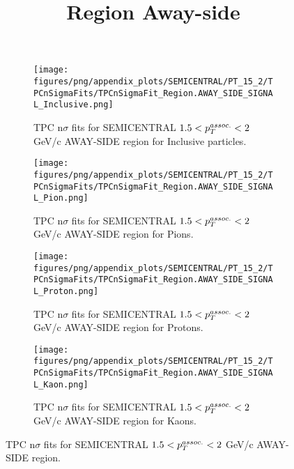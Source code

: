             \begin{figure}[H]
                \title{Region Away-side}
                \begin{subfigure}[b]{0.5\textwidth}
                    \centering
                    \texttt{[image: figures/png/appendix\_plots/SEMICENTRAL/PT\_15\_2/TPCnSigmaFits/TPCnSigmaFit\_Region.AWAY\_SIDE\_SIGNAL\_Inclusive.png]}
                    \caption{TPC n$\sigma$ fits for SEMICENTRAL $1.5 < \pTassoc < 2$ GeV/c AWAY-SIDE region for Inclusive particles.}
                    \label{fig:appendix_SEMICENTRAL_$1.5 < \pTassoc < 2$ GeV/c_AWAY_SIDE_SIGNAL_Inclusive}
                \end{subfigure}
                \begin{subfigure}[b]{0.5\textwidth}
                    \centering
                    \texttt{[image: figures/png/appendix\_plots/SEMICENTRAL/PT\_15\_2/TPCnSigmaFits/TPCnSigmaFit\_Region.AWAY\_SIDE\_SIGNAL\_Pion.png]}
                    \caption{TPC n$\sigma$ fits for SEMICENTRAL $1.5 < \pTassoc < 2$ GeV/c AWAY-SIDE region for Pions.}
                    \label{fig:appendix_SEMICENTRAL_$1.5 < \pTassoc < 2$ GeV/c_AWAY_SIDE_SIGNAL_Pion}
                \end{subfigure}
                \begin{subfigure}[b]{0.5\textwidth}
                    \centering
                    \texttt{[image: figures/png/appendix\_plots/SEMICENTRAL/PT\_15\_2/TPCnSigmaFits/TPCnSigmaFit\_Region.AWAY\_SIDE\_SIGNAL\_Proton.png]}
                    \caption{TPC n$\sigma$ fits for SEMICENTRAL $1.5 < \pTassoc < 2$ GeV/c AWAY-SIDE region for Protons.}
                    \label{fig:appendix_SEMICENTRAL_$1.5 < \pTassoc < 2$ GeV/c_AWAY_SIDE_SIGNAL_Proton}
                \end{subfigure}
                \begin{subfigure}[b]{0.5\textwidth}
                    \centering
                    \texttt{[image: figures/png/appendix\_plots/SEMICENTRAL/PT\_15\_2/TPCnSigmaFits/TPCnSigmaFit\_Region.AWAY\_SIDE\_SIGNAL\_Kaon.png]}
                    \caption{TPC n$\sigma$ fits for SEMICENTRAL $1.5 < \pTassoc < 2$ GeV/c AWAY-SIDE region for Kaons.}
                    \label{fig:appendix_SEMICENTRAL_$1.5 < \pTassoc < 2$ GeV/c_AWAY_SIDE_SIGNAL_Kaon}
                \end{subfigure}
                \caption{TPC n$\sigma$ fits for SEMICENTRAL $1.5 < \pTassoc < 2$ GeV/c AWAY-SIDE region.}
                \label{fig:appendix_SEMICENTRAL_$1.5 < \pTassoc < 2$ GeV/c_AWAY_SIDE_SIGNAL}
            \end{figure}
